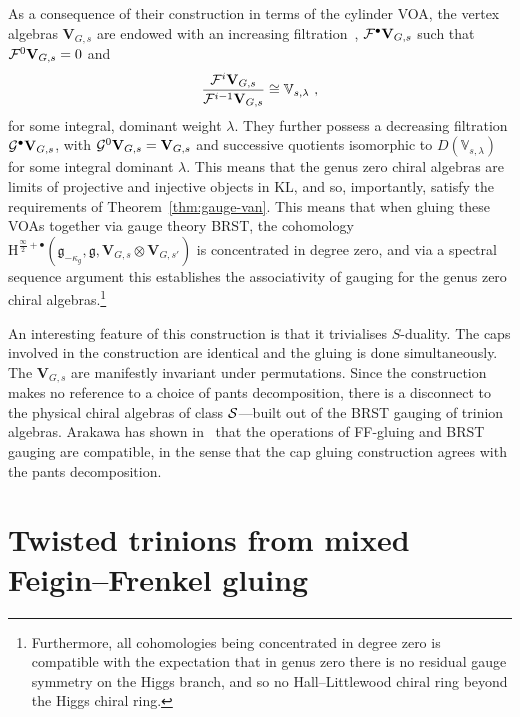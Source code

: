 \documentclass[a4paper]{article}
\def\IV{\mathbb{V}}
\def\FF{{\cal F}}
\def\GG{{\cal G}}
\def\SS{{\cal S}}
\def\gf{\mathfrak{g}}
\def \KL{\mathrm{KL}}
\newcommand{\Hi}[1]{\mathrm{H}^{\frac{\infty}{2}+#1}}
\def\V{\mathbf{V}}
\begin{document}
As a consequence of their construction in terms of the cylinder VOA, the vertex algebras $\V_{G,s}$ are endowed with an increasing filtration~\cite{Arakawa:2018egx}, $\FF^{\bullet}\V_{G,s}$ such that $\FF^0\V_{G,s}=0$ and
\begin{equation}
	\frac{\FF^i\V_{G,s}}{ \FF^{i-1}\V_{G,s} }\cong \IV_{s,\lambda}~,
\end{equation}
for some integral, dominant weight $\lambda$. They further possess a decreasing filtration $\GG^{\bullet}\V_{G,s}$, with $\GG^{0}\V_{G,s} = \V_{G,s}$ and successive quotients isomorphic to $D(\IV_{s,\lambda})$ for some integral dominant $\lambda$. This means that the genus zero chiral algebras are limits of projective and injective objects in $\KL$, and so, importantly, satisfy the requirements of Theorem~\ref{thm:gauge-van}. This means that when gluing these VOAs together via gauge theory BRST, the cohomology $\Hi{\bullet}(\hat{\gf}_{-\kappa_g},\gf,\V_{G,s}\otimes \V_{G,s'})$ is concentrated in degree zero, and via a spectral sequence argument this establishes the associativity of gauging for the genus zero chiral algebras.\footnote{Furthermore, all cohomologies being concentrated in degree zero is compatible with the expectation that in genus zero there is no residual gauge symmetry on the Higgs branch, and so no Hall--Littlewood chiral ring beyond the Higgs chiral ring.}

An interesting feature of this construction is that it trivialises $S$-duality. The caps involved in the construction are identical and the gluing is done simultaneously. The $\V_{G,s}$ are manifestly invariant under permutations. Since the construction makes no reference to a choice of pants decomposition, there is a disconnect to the physical chiral algebras of class $\SS$---built out of the BRST gauging of trinion algebras. Arakawa has shown in~\cite{Arakawa:2018egx} that the operations of FF-gluing and BRST gauging are compatible, in the sense that the cap gluing construction agrees with the pants decomposition.

\section{\label{sec:fixtures}Twisted trinions from mixed Feigin--Frenkel gluing}
\end{document}
